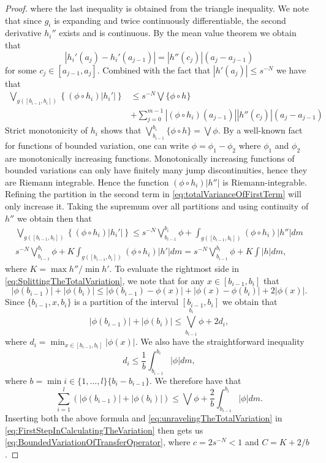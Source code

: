 \documentclass[pdftex,11pt,a4paper,oneside]{article}
\theoremstyle{plain}
\begin{document}
\begin{proof}
where the last inequality is obtained from the triangle inequality. We note that since $g_i$ is expanding and twice continuously differentiable, the second derivative $h_i''$ exists and is continuous. By the mean value theorem we obtain that 
\[ |h_i'(a_{j}) -h_i'(a_{j-1})| =  |h''(c_j)|(a_{j}-a_{j-1})\]
for some $c_j\in [a_{j-1},a_j]$. Combined with the fact that $|h'(a_j)|\leq s^{-N}$ we have that 
\begin{equation}\label{eq:totalVarianceOfFirstTerm}
    \begin{split}
        \bigvee_{g([b_{i-1},b_i])}\left\{ (\phi\circ h_i)|h_i'|\right\} &\leq s^{-N}\bigvee\{\phi\circ h\}\\
        &+ \sum_{j=0}^{m-1}|(\phi\circ h_i)(a_{j-1})||h''(c_j)|(a_{j}-a_{j-1})
    \end{split}
\end{equation}
Strict monotonicity of $h_i$ shows that $\bigvee_{b_{i-1}}^{b_i}\{\phi\circ h\} = \bigvee \phi$. By a well-known fact for functions of bounded variation, one can write $\phi = \phi_1-\phi_2$ where $\phi_1$ and $\phi_2$ are monotonically increasing functions. Monotonically increasing functions of bounded variations can only have finitely many jump discontinuities, hence they are Riemann integrable. Hence the function $(\phi\circ h_i) |h''|$ is Riemann-integrable. Refining the partition in the second term in \ref{eq:totalVarianceOfFirstTerm} will only increase it. Taking the supremum over all partitions and using continuity of $h''$ we obtain then that
\begin{equation}\label{eq:unravelingTheTotalVariation}
    \begin{split}
        \bigvee_{g([b_{i-1},b_i])}\left\{ (\phi\circ h_i)|h_i'|\right\} \leq s^{-N}\bigvee_{b_{i-1}}^{b_i} \phi + \int_{g([b_{i-1},b_i])}(\phi\circ h_i) |h''| dm \\
        s^{-N}\bigvee_{b_{i-1}}^{b_i} \phi + K\int_{g([b_{i-1},b_i])}(\phi\circ h_i) |h'| dm =s^{-N}\bigvee_{b_{i-1}}^{b_i} \phi + K\int|h| dm ,
    \end{split}
\end{equation}
where $K=  \max h''/\min h'$. To evaluate the rightmost side in \ref{eq:SplittingTheTotalVariation}, we note that for any $x\in [b_{i-1},b_i]$ that
\[|\phi(b_{i-1})|+|\phi(b_i)|\leq |\phi(b_{i-1}) -\phi(x)|+|\phi(x)-\phi(b_i)| +2|\phi(x)|.\]
 Since $\{b_{i-1},x,b_i\}$ is a partition of the interval $[b_{i-1},b_i]$ we obtain that
 \[|\phi(b_{i-1})|+|\phi(b_i)|\leq \bigvee_{b_{i-1}}^{b_i}\phi + 2d_i,\]
 where $d_i = \min_{x\in[b_{i-1},b_i]}|\phi(x)|$. We also have the straightforward inequality
 \[d_i \leq \frac{1}{b}\int_{b_{i-1}}^{b_i}|\phi|dm ,\]
where $b=\min{i\in\{1,\ldots,l\}}\{b_i-b_{i-1}\}$. We therefore have that
\[\sum_{i=1}^l(|\phi(b_{i-1})|+|\phi(b_i)|)\leq \bigvee\phi +\frac{2}{b}\int_{b_{i-1}}^{b_i}|\phi|dm.\]
Inserting both the above formula and \eqref{eq:unravelingTheTotalVariation} in \eqref{eq:FirstStepInCalculatingTheVariation} then gets us \eqref{eq:BoundedVariationOfTransferOperator}, where $c = 2s^{-N}<1$ and $C = K+2/b$.
\end{proof}
\end{document}
